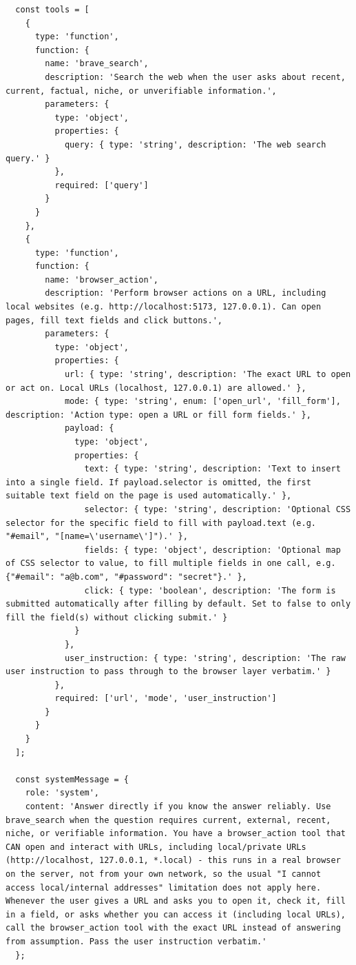 \begin{lstlisting}
  const tools = [
    {
      type: 'function',
      function: {
        name: 'brave_search',
        description: 'Search the web when the user asks about recent, current, factual, niche, or unverifiable information.',
        parameters: {
          type: 'object',
          properties: {
            query: { type: 'string', description: 'The web search query.' }
          },
          required: ['query']
        }
      }
    },
    {
      type: 'function',
      function: {
        name: 'browser_action',
        description: 'Perform browser actions on a URL, including local websites (e.g. http://localhost:5173, 127.0.0.1). Can open pages, fill text fields and click buttons.',
        parameters: {
          type: 'object',
          properties: {
            url: { type: 'string', description: 'The exact URL to open or act on. Local URLs (localhost, 127.0.0.1) are allowed.' },
            mode: { type: 'string', enum: ['open_url', 'fill_form'], description: 'Action type: open a URL or fill form fields.' },
            payload: {
              type: 'object',
              properties: {
                text: { type: 'string', description: 'Text to insert into a single field. If payload.selector is omitted, the first suitable text field on the page is used automatically.' },
                selector: { type: 'string', description: 'Optional CSS selector for the specific field to fill with payload.text (e.g. "#email", "[name=\'username\']").' },
                fields: { type: 'object', description: 'Optional map of CSS selector to value, to fill multiple fields in one call, e.g. {"#email": "a@b.com", "#password": "secret"}.' },
                click: { type: 'boolean', description: 'The form is submitted automatically after filling by default. Set to false to only fill the field(s) without clicking submit.' }
              }
            },
            user_instruction: { type: 'string', description: 'The raw user instruction to pass through to the browser layer verbatim.' }
          },
          required: ['url', 'mode', 'user_instruction']
        }
      }
    }
  ];

  const systemMessage = {
    role: 'system',
    content: 'Answer directly if you know the answer reliably. Use brave_search when the question requires current, external, recent, niche, or verifiable information. You have a browser_action tool that CAN open and interact with URLs, including local/private URLs (http://localhost, 127.0.0.1, *.local) - this runs in a real browser on the server, not from your own network, so the usual "I cannot access local/internal addresses" limitation does not apply here. Whenever the user gives a URL and asks you to open it, check it, fill in a field, or asks whether you can access it (including local URLs), call the browser_action tool with the exact URL instead of answering from assumption. Pass the user instruction verbatim.'
  };


\end{lstlisting}
